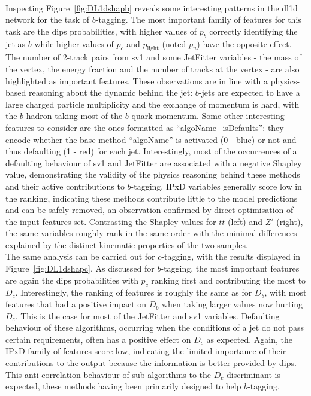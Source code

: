 \paragraph{}Inspecting Figure~\ref{fig:DL1dshapb} reveals some interesting patterns in the \gls{dl1d} network for the task of $b$-tagging. The most important family of features for this task are the \gls{dips} probabilities, with higher values of $p_b$ correctly identifying the jet as $b$ while higher values of $p_c$ and $p_{\textrm{light}}$ (noted $p_u$) have the opposite effect. The number of 2-track pairs from \gls{sv1} and some JetFitter variables - the mass of the vertex, the energy fraction and the number of tracks at the vertex - are also highlighted as important features. These observations are in line with a physics-based reasoning about the dynamic behind the jet: $b$-jets are expected to have a large charged particle multiplicity and the exchange of momentum is hard, with the $b$-hadron taking most of the $b$-quark momentum. Some other interesting features to consider are the ones formatted as  ``algoName\_isDefaults'': they encode whether the base-method ``algoName'' is activated (0 - blue) or not and thus defaulting (1 - red) for each jet. Interestingly, most of the occurrences of a defaulting behaviour of \gls{sv1} and JetFitter are associated with a negative Shapley value, demonstrating the validity of the physics reasoning behind these methods and their active contributions to $b$-tagging. IPxD variables generally score low in the ranking, indicating these methods contribute little to the model predictions and can be safely removed, an observation confirmed by direct optimisation of the input features set. Contrasting the Shapley values for $t\bar{t}$ (left) and $Z'$ (right), the same variables roughly rank in the same order with the minimal differences explained by the distinct kinematic properties of the two samples. \\

The same analysis can be carried out for $c$-tagging, with the results displayed in Figure~\ref{fig:DL1dshapc}. As discussed for $b$-tagging, the most important features are again the \gls{dips} probabilities with $p_c$ ranking first and contributing the most to $D_c$. Interestingly, the ranking of features is roughly the same as for $D_b$, with most features that had a positive impact on $D_b$ when taking larger values now hurting $D_c$. This is the case for most of the JetFitter and \gls{sv1} variables. Defaulting behaviour of these algorithms, occurring when the conditions of a jet do not pass certain requirements, often has a positive effect on $D_c$ as expected. Again, the IPxD family of features score low, indicating the limited importance of their contributions to the output because the information is better provided by \gls{dips}. This anti-correlation behaviour of sub-algorithms to the $D_c$ discriminant is expected, these methods having been primarily designed to help $b$-tagging. 

